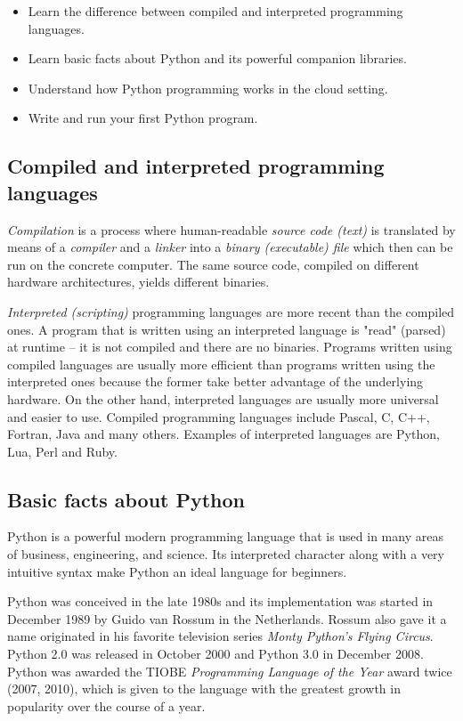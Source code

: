 \documentclass[article,A4,12pt]{llncs}
\begin{document}
\begin{itemize}
\item Learn the difference between compiled and interpreted programming languages.
\item Learn basic facts about Python and its powerful companion libraries.
\item Understand how Python programming works in the cloud setting.
\item Write and run your first Python program.
\end{itemize}

\subsection{Compiled and interpreted programming languages}

{\em Compilation} is a process where human-readable {\em source code (text)} is translated by
means of a {\em compiler} and a {\em linker}
into a {\em binary (executable) file} which then can be run on the concrete computer. The same 
source code, compiled on different hardware architectures, yields different binaries. 

{\em Interpreted (scripting)} programming languages are more recent than the compiled ones. 
A program that is written using an interpreted language is "read" (parsed) at runtime -- it is 
not compiled and there are no binaries. Programs 
written using compiled languages are usually more efficient than programs written using the interpreted 
ones because the former take better advantage of the underlying hardware. On the other hand,
interpreted languages are usually more universal and easier to use. Compiled 
programming languages include Pascal, C, C++, Fortran, Java and many others. Examples of interpreted 
languages are Python, Lua, Perl and Ruby. 

\subsection{Basic facts about Python}

Python is a powerful modern programming language that is used in many areas of business, 
engineering, and science. Its interpreted character along with a very intuitive syntax make Python an 
ideal language for beginners. 

Python was conceived in the late 1980s and its implementation was started in December 1989
by Guido van Rossum in the Netherlands. Rossum also gave it a name originated
in his favorite television series {\em Monty Python's Flying Circus}.
Python 2.0 was released in October 2000 and Python 3.0 in December 2008. Python was
awarded the TIOBE {\em Programming Language of the Year} award twice (2007, 2010), which is 
given to the language with the greatest growth in popularity over the course of a year.
\end{document}
